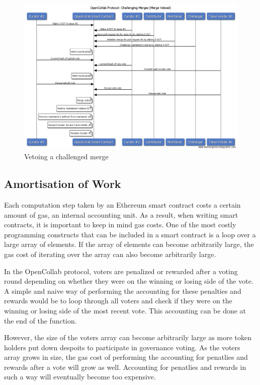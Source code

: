 \begin{figure}[p!]
  \centering
  \includegraphics[width=\linewidth,keepaspectratio]{figures/OpenCollab-Protocol-Challenging-Merges-Veto.png}
  \caption{Vetoing a challenged merge}
\end{figure}

\subsection{Amortisation of Work}

Each computation step taken by an Ethereum smart contract costs a certain amount
of gas, an internal accounting unit. As a result, when writing smart contracts,
it is important to keep in mind gas costs. One of the most costly programming
constructs that can be included in a smart contract is a loop over a large array
of elements. If the array of elements can become arbitrarily large, the gas cost
of iterating over the array can also become arbitrarily large.

In the OpenCollab protocol, voters are penalized or rewarded after a voting
round depending on whether they were on the winning or losing side of the vote.
A simple and naive way of performing the accounting for these penalties and
rewards would be to loop through all voters and check if they were on the
winning or losing side of the most recent vote. This accounting can be done at
the end of the  function.

However, the size of the voters array can become arbitrarily large as more token
holders put down despoits to participate in governance voting. As the voters
array grows in size, the gas cost of performing the accounting for penatlies and
rewards after a vote will grow as well. Accounting for penatlies and rewards in
such a way will eventually become too expensive.

